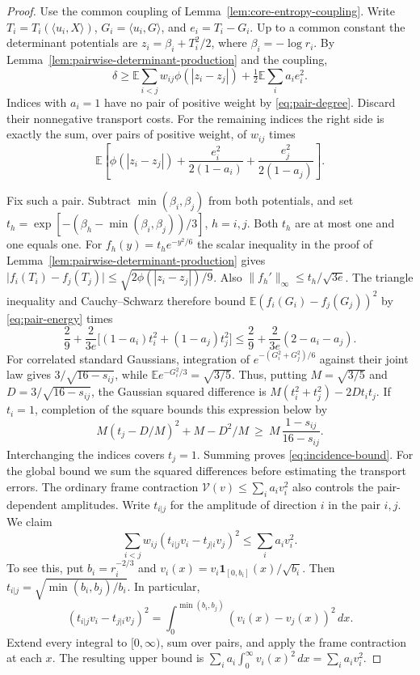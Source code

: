 \documentclass[11pt,a4paper]{article}
\theoremstyle{remark}\newtheorem{remark}[theorem]{Remark}
\numberwithin{equation}{section}
\begin{document}
\begin{proof}
Use the common coupling of Lemma~\ref{lem:core-entropy-coupling}.
Write \(T_i=T_i(\langle u_i,X\rangle)\), \(G_i=\langle u_i,G\rangle\),
and \(e_i=T_i-G_i\). Up to a common constant the determinant potentials
are \(z_i=\beta_i+T_i^2/2\), where \(\beta_i=-\log r_i\).
By Lemma~\ref{lem:pairwise-determinant-production} and the coupling,
\[
 \delta\ge\mathbb E\sum_{i<j}w_{ij}\phi(|z_i-z_j|)
                  +\tfrac12\mathbb E\sum_i a_i e_i^2.
\]
Indices with \(a_i=1\) have no pair of positive weight by
\eqref{eq:pair-degree}. Discard their nonnegative transport costs.
For the remaining indices the right side is exactly the sum, over
pairs of positive weight, of \(w_{ij}\) times
\begin{equation}\label{eq:pair-energy}
 \mathbb E\left[\phi(|z_i-z_j|)
       +\frac{e_i^2}{2(1-a_i)}+\frac{e_j^2}{2(1-a_j)}\right].
\end{equation}

Fix such a pair. Subtract \(\min(\beta_i,\beta_j)\) from both potentials,
and set \(t_h=\exp[-(\beta_h-\min(\beta_i,\beta_j))/3]\),
\(h=i,j\). Both \(t_h\) are at most one and one equals one. For
\(f_h(y)=t_h e^{-y^2/6}\) the scalar inequality in the proof of
Lemma~\ref{lem:pairwise-determinant-production} gives
\(\lvert f_i(T_i)-f_j(T_j)\rvert\le\sqrt{2\phi(|z_i-z_j|)/9}\).
Also \(\|f_h'\|_\infty\le t_h/\sqrt{3e}\).
The triangle inequality and Cauchy--Schwarz therefore bound
\(\mathbb E(f_i(G_i)-f_j(G_j))^2\) by \eqref{eq:pair-energy} times
\[
 \frac29+\frac2{3e}\big[(1-a_i)t_i^2+(1-a_j)t_j^2\big]
 \le\frac29+\frac2{3e}(2-a_i-a_j).
\]
For correlated standard Gaussians, integration of
\(e^{-(G_i^2+G_j^2)/6}\) against their joint law gives
\(3/\sqrt{16-s_{ij}}\), while \(\mathbb E e^{-G_i^2/3}=\sqrt{3/5}\).
Thus, putting \(M=\sqrt{3/5}\) and
\(D=3/\sqrt{16-s_{ij}}\), the Gaussian squared difference is
\(M(t_i^2+t_j^2)-2Dt_it_j\). If \(t_i=1\), completion of the square
bounds this expression below by
\[
 M(t_j-D/M)^2+M-D^2/M\ \ge\
 M\,\frac{1-s_{ij}}{16-s_{ij}} .
\]
Interchanging the indices covers \(t_j=1\). Summing proves
\eqref{eq:incidence-bound}. 
For the global bound we sum the squared differences before estimating
the transport errors. The ordinary frame contraction
\(\mathcal V(v)\le\sum_i a_i v_i^2\) also controls the
pair-dependent amplitudes. Write \(t_{i|j}\) for the amplitude of
direction \(i\) in the pair \(i,j\). We claim
\begin{equation}\label{eq:schur-angular}
 \sum_{i<j} w_{ij}(t_{i|j}v_i-t_{j|i}v_j)^2\le\sum_i a_i v_i^2 .
\end{equation}
To see this, put \(b_i=r_i^{-2/3}\) and
\(v_i(x)=v_i\mathbf 1_{[0,b_i]}(x)/\sqrt{b_i}\).
Then \(t_{i|j}=\sqrt{\min(b_i,b_j)/b_i}\). In particular,
\[
 (t_{i|j}v_i-t_{j|i}v_j)^2
 =\int_0^{\min(b_i,b_j)}(v_i(x)-v_j(x))^2\,dx .
\]
Extend every integral to \([0,\infty)\), sum over pairs, and apply the
frame contraction at each \(x\). The resulting upper bound is
\(\sum_i a_i\int_0^\infty v_i(x)^2\,dx=\sum_i a_i v_i^2\).


\end{proof}
\end{document}
